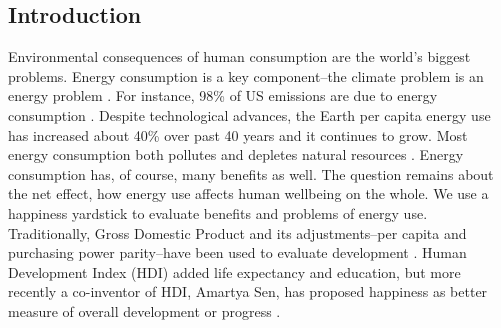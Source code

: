\documentclass[10pt, letterpaper]{article}
\begin{document}
\begin{spacing}{1.0}




\section*{\large \bf Introduction} %

Environmental consequences of human consumption are the world's biggest
problems.  Energy consumption is a key component--the climate problem is an
energy problem \citep{mackay08}. For instance, 98\% of US emissions are due to
energy consumption \citep{eia08}. Despite
technological advances, the Earth per capita energy use has increased about 40\%
over past 40 years and it continues to grow. %
Most energy consumption both pollutes and  depletes natural resources
\citep{arrow04, soytas07}. %
 Energy consumption has, of course, many benefits as well.
 The question remains about the net effect, how energy use affects human
 wellbeing on the whole.
We use a happiness yardstick
to evaluate benefits and problems of energy use. Traditionally, Gross Domestic
Product and its adjustments--per capita and purchasing power parity--have been
used to evaluate development \citep{jorgenson14C}. Human Development Index (HDI)
added life expectancy and education, but more recently a co-inventor of HDI,
Amartya Sen, has proposed happiness as better measure of overall development or
progress 
\citep{stiglitz09al}. 


\end{spacing}
\end{document}
